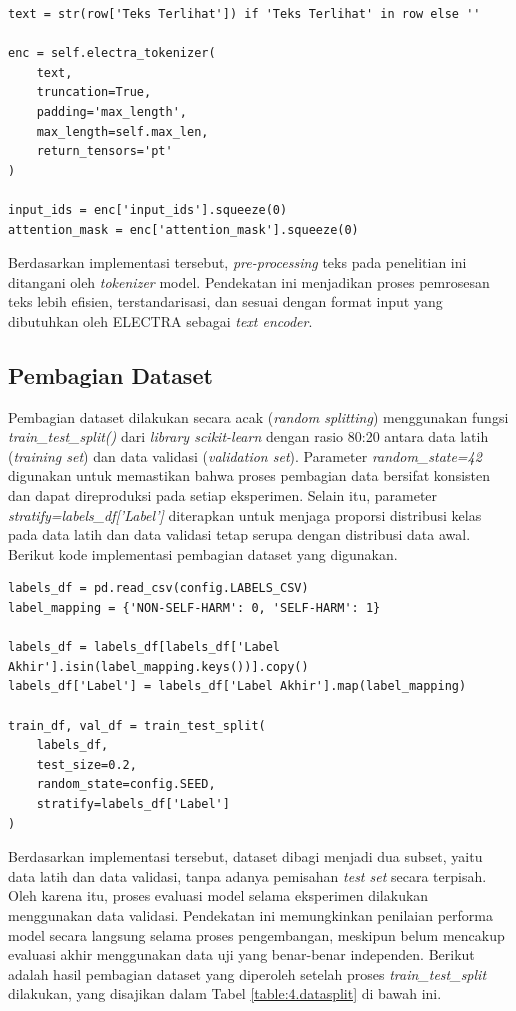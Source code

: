 \begin{lstlisting}[caption={Kode \textit{Pre-processing} Teks}, label={code:4.preprocessing_teks}]
text = str(row['Teks Terlihat']) if 'Teks Terlihat' in row else ''

enc = self.electra_tokenizer(
    text,
    truncation=True,
    padding='max_length',
    max_length=self.max_len,
    return_tensors='pt'
)

input_ids = enc['input_ids'].squeeze(0)
attention_mask = enc['attention_mask'].squeeze(0)
\end{lstlisting}

Berdasarkan implementasi tersebut, \textit{pre-processing} teks pada penelitian ini ditangani oleh \textit{tokenizer} model. Pendekatan ini menjadikan proses pemrosesan teks lebih efisien, terstandarisasi, dan sesuai dengan format input yang dibutuhkan oleh ELECTRA sebagai \textit{text encoder}.

\subsection{Pembagian Dataset} \label{IV.Preprocessing.Split}
Pembagian dataset dilakukan secara acak (\textit{random splitting}) menggunakan fungsi \textit{train\_test\_split()} dari  \textit{library scikit-learn} dengan rasio 80:20 antara data latih (\textit{training set}) dan data validasi (\textit{validation set}). Parameter \textit{random\_state=42} digunakan untuk memastikan bahwa proses pembagian data bersifat konsisten dan dapat direproduksi pada setiap eksperimen. Selain itu, parameter \textit{stratify=labels\_df['Label']} diterapkan untuk menjaga proporsi distribusi kelas pada data latih dan data validasi tetap serupa dengan distribusi data awal. Berikut kode implementasi pembagian dataset yang digunakan.

\begin{lstlisting}[caption={Kode Pembagian Dataset}, label={code:4.pembagian_dataset}]
labels_df = pd.read_csv(config.LABELS_CSV)
label_mapping = {'NON-SELF-HARM': 0, 'SELF-HARM': 1}

labels_df = labels_df[labels_df['Label Akhir'].isin(label_mapping.keys())].copy()
labels_df['Label'] = labels_df['Label Akhir'].map(label_mapping)

train_df, val_df = train_test_split(
    labels_df,
    test_size=0.2,
    random_state=config.SEED,
    stratify=labels_df['Label']
)
\end{lstlisting}

Berdasarkan implementasi tersebut, dataset dibagi menjadi dua subset, yaitu data latih dan data validasi, tanpa adanya pemisahan \textit{test set} secara terpisah. Oleh karena itu, proses evaluasi model selama eksperimen dilakukan menggunakan data validasi. Pendekatan ini memungkinkan penilaian performa model secara langsung selama proses pengembangan, meskipun belum mencakup evaluasi akhir menggunakan data uji yang benar-benar independen. Berikut adalah hasil pembagian dataset yang diperoleh setelah proses \textit{train\_test\_split} dilakukan, yang disajikan dalam Tabel \ref{table:4.datasplit} di bawah ini.


